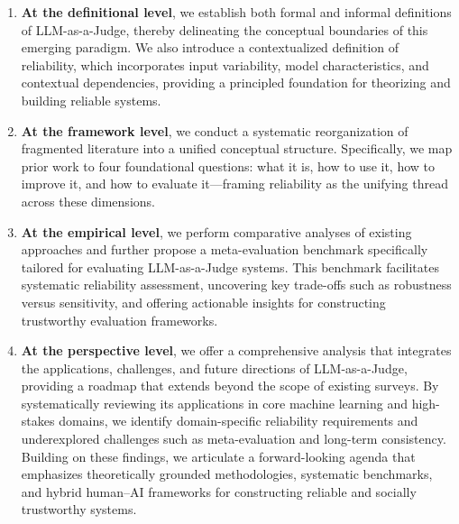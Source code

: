 \documentclass[acmsmall,screen]{acmart}
\begin{document}
\begin{enumerate}
    \item \textbf{At the definitional level}, we establish both formal and informal definitions of LLM-as-a-Judge, thereby delineating the conceptual boundaries of this emerging paradigm. We also introduce a contextualized definition of reliability, which incorporates input variability, model characteristics, and contextual dependencies, providing a principled foundation for theorizing and building reliable systems.
    
    \item \textbf{At the framework level}, we conduct a systematic reorganization of fragmented literature into a unified conceptual structure. Specifically, we map prior work to four foundational questions: what it is, how to use it, how to improve it, and how to evaluate it—framing reliability as the unifying thread across these dimensions.
    
    \item \textbf{At the empirical level}, we perform comparative analyses of existing approaches and further propose a meta-evaluation benchmark specifically tailored for evaluating LLM-as-a-Judge systems. This benchmark facilitates systematic reliability assessment, uncovering key trade-offs such as robustness versus sensitivity, and offering actionable insights for constructing trustworthy evaluation frameworks.
    
    \item \textbf{At the perspective level}, we offer a comprehensive analysis that integrates the applications, challenges, and future directions of LLM-as-a-Judge, providing a roadmap that extends beyond the scope of existing surveys. By systematically reviewing its applications in core machine learning and high-stakes domains, we identify domain-specific reliability requirements and underexplored challenges such as meta-evaluation and long-term consistency. Building on these findings, we articulate a forward-looking agenda that emphasizes theoretically grounded methodologies, systematic benchmarks, and hybrid human–AI frameworks for constructing reliable and socially trustworthy systems.

\end{enumerate}
\end{document}
